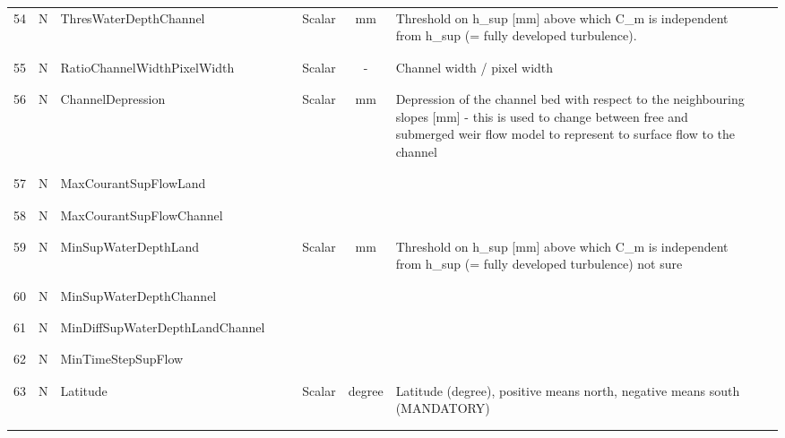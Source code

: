 \begin{longtable}{|c|c|l|c|c|c|c|p{}|c|p{}|}
54 & N & ThresWaterDepthChannel & & & Scalar & mm & \parbox[c]{\hsize}{Threshold on h\_sup [mm] above which C\_m is independent from h\_sup (= fully developed turbulence). } & & \\
&&&&&&&&&\\\hline%
&&&&&&&&&\\
55 & N & RatioChannelWidthPixelWidth & & & Scalar & - & \parbox[c]{\hsize}{Channel width / pixel width} & & \\
&&&&&&&&&\\\hline%
&&&&&&&&&\\
56 & N & ChannelDepression & & & Scalar & mm & \parbox[c]{\hsize}{Depression of the channel bed with respect to the neighbouring slopes [mm] - this is used to change between free and submerged weir flow model to represent to surface flow to the channel} & & \\
&&&&&&&&&\\\hline%
&&&&&&&&&\\
57 & N & MaxCourantSupFlowLand & & & & & & & \\
&&&&&&&&&\\\hline%
&&&&&&&&&\\
58 & N & MaxCourantSupFlowChannel & & & & & & & \\
&&&&&&&&&\\\hline%
&&&&&&&&&\\
59 & N & MinSupWaterDepthLand & & & Scalar & mm & \parbox[c]{\hsize}{Threshold on h\_sup [mm] above which C\_m is independent from h\_sup (= fully developed turbulence) not sure} & & \\
&&&&&&&&&\\\hline%
&&&&&&&&&\\
60 & N & MinSupWaterDepthChannel & & & & & & & \\
&&&&&&&&&\\\hline%
&&&&&&&&&\\
61 & N & MinDiffSupWaterDepthLandChannel & & & & & & & \\
&&&&&&&&&\\\hline%
&&&&&&&&&\\
62 & N & MinTimeStepSupFlow & & & & & & & \\
&&&&&&&&&\\\hline%
&&&&&&&&&\\
63 & N & Latitude & & & Scalar & degree & \parbox[c]{\hsize}{Latitude (degree), positive means north, negative means south (MANDATORY)} & & \\
&&&&&&&&&\\\hline%
&&&&&&&&&\\

\end{longtable}
